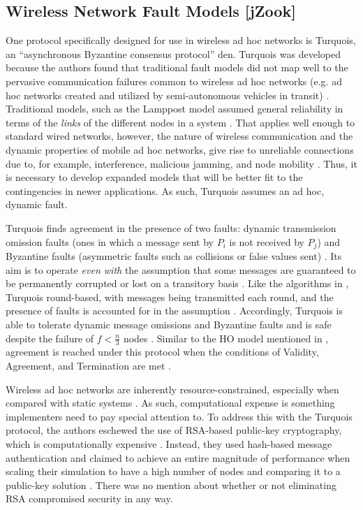\documentclass[twoside, conference]{IEEEtran}
\begin{document}
\subsection{Wireless Network Fault Models [jZook]}


One protocol specifically designed for use in wireless ad hoc networks is Turquois, an ``asynchronous Byzantine consensus protocol'' \cite{Moniz2013}{den}. Turquois was developed because the authors found that traditional fault models did not map well to the pervasive communication failures common to wireless ad hoc networks (e.g. ad hoc networks created and utilized by semi-autonomous vehicles in transit) \cite{Moniz2013}. Traditional models, such as the Lamppost model assumed general reliability in terms of the \textit{links} of the different nodes in a system \cite{Moniz2013}. That applies well enough to standard wired networks, however, the nature of wireless communication and the dynamic properties of mobile ad hoc networks, give rise to unreliable connections due to, for example, interference, malicious jamming, and node mobility \cite{Moniz2013}. Thus, it is necessary to develop expanded models that will be better fit to the contingencies in newer applications. As such, Turquois assumes an ad hoc, dynamic fault\cite{Moniz2013}.

Turquois finds agreement in the presence of two faults: dynamic transmission omission faults (ones in which a message sent by $P_i$ is not received by $P_j$) and Byzantine faults (asymmetric faults such as collisions or false values sent) \cite{Moniz2013}. Its aim is to operate \textit{even with} the assumption that some messages are guaranteed to be permanently corrupted or lost on a transitory basis \cite{Moniz2013}. Like the algorithms in \cite{bialy}, Turquois round-based, with messages being transmitted each round, and the presence of faults is accounted for in the assumption \cite{Moniz2013}. Accordingly, Turquois is able to tolerate dynamic message omissions and Byzantine faults and is safe despite the failure of $f < \frac{n}{3}$ nodes \cite{Moniz2013}. Similar to the HO model mentioned in \cite{bialy}, agreement is reached under this protocol when the conditions of Validity, Agreement, and Termination are met \cite{Moniz2013}.

Wireless ad hoc networks are inherently resource-constrained, especially when compared with static systems \cite{Moniz2013}. As such, computational expense is something implementers need to pay special attention to. To address this with the Turquois protocol, the authors eschewed the use of RSA-based public-key cryptography, which is computationally expensive \cite{Moniz2013}. Instead, they used hash-based message authentication and claimed to achieve an entire magnitude of performance when scaling their simulation to have a high number of nodes and comparing it to a public-key solution \cite{Moniz2013}. There was no mention about whether or not eliminating RSA compromised security in any way.
\end{document}
